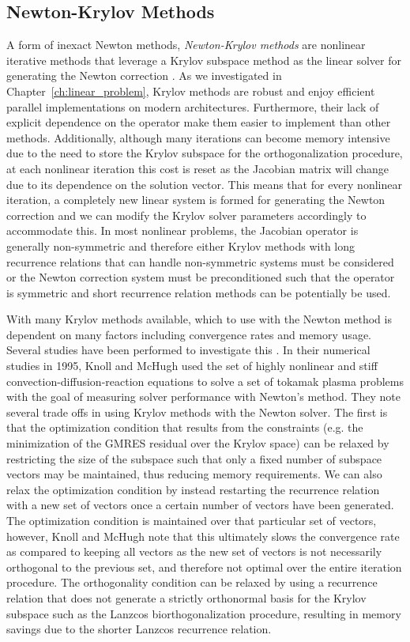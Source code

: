 \subsection{Newton-Krylov Methods}
\label{subsec:newton_krylov_methods}
A form of inexact Newton methods, \textit{Newton-Krylov methods} are
nonlinear iterative methods that leverage a Krylov subspace method as
the linear solver for generating the Newton correction
\citep{kelley_iterative_1995}. As we investigated in
Chapter~\ref{ch:linear_problem}, Krylov methods are robust and enjoy
efficient parallel implementations on modern
architectures. Furthermore, their lack of explicit dependence on the
operator make them easier to implement than other
methods. Additionally, although many iterations can become memory
intensive due to the need to store the Krylov subspace for the
orthogonalization procedure, at each nonlinear iteration this cost is
reset as the Jacobian matrix will change due to its dependence on the
solution vector. This means that for every nonlinear iteration, a
completely new linear system is formed for generating the Newton
correction and we can modify the Krylov solver parameters accordingly
to accommodate this. In most nonlinear problems, the Jacobian operator
is generally non-symmetric and therefore either Krylov methods with
long recurrence relations that can handle non-symmetric systems must be
considered or the Newton correction system must be preconditioned such
that the operator is symmetric and short recurrence relation methods
can be potentially be used.

With many Krylov methods available, which to use with the Newton
method is dependent on many factors including convergence rates and
memory usage. Several studies have been performed to investigate this
\citep{mchugh_inexact_1993,knoll_newton-krylov_1995}. In their
numerical studies in 1995, Knoll and McHugh used the set of highly
nonlinear and stiff convection-diffusion-reaction equations to solve a
set of tokamak plasma problems with the goal of measuring solver
performance with Newton's method. They note several trade offs in using
Krylov methods with the Newton solver. The first is that the
optimization condition that results from the constraints (e.g. the
minimization of the GMRES residual over the Krylov space) can be
relaxed by restricting the size of the subspace such that only a fixed
number of subspace vectors may be maintained, thus reducing memory
requirements. We can also relax the optimization condition by instead
restarting the recurrence relation with a new set of vectors once a
certain number of vectors have been generated. The optimization
condition is maintained over that particular set of vectors, however,
Knoll and McHugh note that this ultimately slows the convergence rate
as compared to keeping all vectors as the new set of vectors is not
necessarily orthogonal to the previous set, and therefore not optimal
over the entire iteration procedure. The orthogonality condition can
be relaxed by using a recurrence relation that does not generate a
strictly orthonormal basis for the Krylov subspace such as the Lanzcos
biorthogonalization procedure, resulting in memory savings due to the
shorter Lanzcos recurrence relation.

